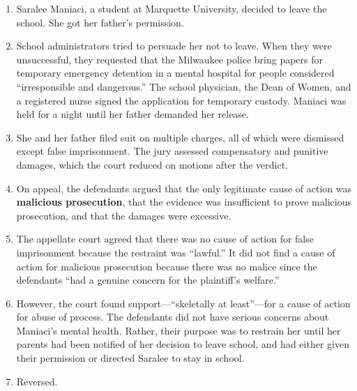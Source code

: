 \begin{enumerate}
    \item Saralee Maniaci, a student at Marquette University, decided to leave 
    the school. She got her father's permission.
    \item School administrators tried to persuade her not to leave. When they 
    were unsuccessful, they requested that the Milwaukee police bring papers 
    for temporary emergency detention in a mental hospital for people 
    considered ``irresponsible and dangerous.'' The school physician, the Dean 
    of Women, and a registered nurse signed the application for temporary 
    custody. Maniaci was held for a night until her father demanded her 
    release.
    \item She and her father filed suit on multiple charges, all of which were 
    dismissed except false imprisonment. The jury assessed compensatory and 
    punitive damages, which the court reduced on motions after the verdict.
    \item On appeal, the defendants argued that the only legitimate cause of 
    action was \textbf{malicious prosecution}, that the evidence was 
    insufficient to prove malicious prosecution, and that the damages were 
    excessive.
    \item The appellate court agreed that there was no cause of action for 
    false imprisonment because the restraint was ``lawful.'' It did not find a 
    cause of action for malicious prosecution because there was no malice 
    since the defendants ``had a genuine concern for the plaintiff's 
    welfare.'' \item However, the court found support---``skeletally at 
    least''---for a cause of action for abuse of process. The defendants did 
    not have serious concerns about Maniaci's mental health. Rather, their 
    purpose was to restrain her until her parents had been notified of her 
    decision to leave school, and had either given their permission or 
    directed Saralee to stay in school.
    \item Reversed. 
\end{enumerate}

